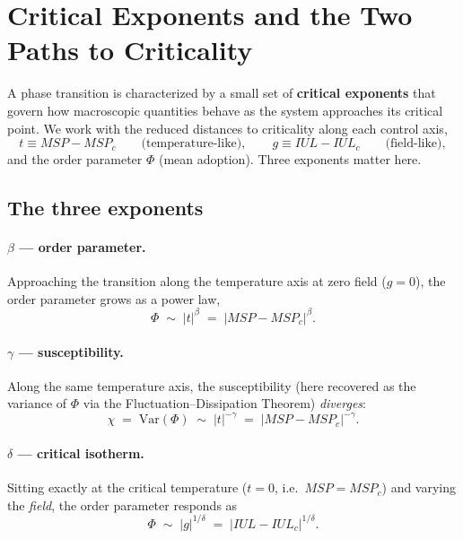 \documentclass[11pt]{article}
\begin{document}
\section{Critical Exponents and the Two Paths to Criticality}

A phase transition is characterized by a small set of \textbf{critical exponents} that govern how macroscopic quantities behave as the system approaches its critical point. We work with the reduced distances to criticality along each control axis,
\begin{equation}
    t \equiv MSP - MSP_c \qquad \text{(temperature-like)}, \qquad
    g \equiv IUL - IUL_c \qquad \text{(field-like)} ,
\end{equation}
and the order parameter $\Phi$ (mean adoption). Three exponents matter here.

\subsection{The three exponents}
\paragraph{$\beta$ — order parameter.} Approaching the transition along the temperature axis at zero field ($g=0$), the order parameter grows as a power law,
\begin{equation}
    \Phi \;\sim\; |t|^{\beta} \;=\; |MSP - MSP_c|^{\beta} .
\end{equation}

\paragraph{$\gamma$ — susceptibility.} Along the same temperature axis, the susceptibility (here recovered as the variance of $\Phi$ via the Fluctuation--Dissipation Theorem) \emph{diverges}:
\begin{equation}
    \chi \;=\; \mathrm{Var}(\Phi) \;\sim\; |t|^{-\gamma} \;=\; |MSP - MSP_c|^{-\gamma} .
\end{equation}

\paragraph{$\delta$ — critical isotherm.} Sitting exactly at the critical temperature ($t=0$, i.e.\ $MSP=MSP_c$) and varying the \emph{field}, the order parameter responds as
\begin{equation}
    \Phi \;\sim\; |g|^{1/\delta} \;=\; |IUL - IUL_c|^{1/\delta} .
\end{equation}
\end{document}
